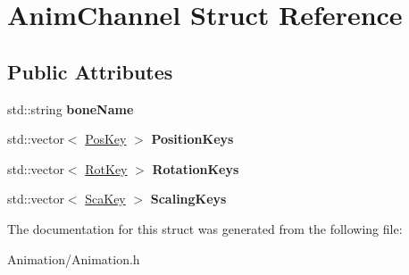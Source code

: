 \hypertarget{structAnimChannel}{}\section{Anim\+Channel Struct Reference}
\label{structAnimChannel}
\subsection*{Public Attributes}
\begin{DoxyCompactItemize}
\item 
\mbox{\label{structAnimChannel_ae8ef1d4ed06cee3b78e6ae9b1f5ffb72}} 
std\+::string {\bfseries bone\+Name}
\item 
\mbox{\label{structAnimChannel_a7cc45c3dde2b32f0adc2f0b1d3f446b4}} 
std\+::vector$<$ \hyperlink{structPosKey}{Pos\+Key} $>$ {\bfseries Position\+Keys}
\item 
\mbox{\label{structAnimChannel_a22d7a0a91617e84bbd37480cb16c2c6c}} 
std\+::vector$<$ \hyperlink{structRotKey}{Rot\+Key} $>$ {\bfseries Rotation\+Keys}
\item 
\mbox{\label{structAnimChannel_a1811e8986219569ddcf8a5e39c464892}} 
std\+::vector$<$ \hyperlink{structScaKey}{Sca\+Key} $>$ {\bfseries Scaling\+Keys}
\end{DoxyCompactItemize}


The documentation for this struct was generated from the following file\+:\begin{DoxyCompactItemize}
\item 
Animation/Animation.\+h\end{DoxyCompactItemize}
